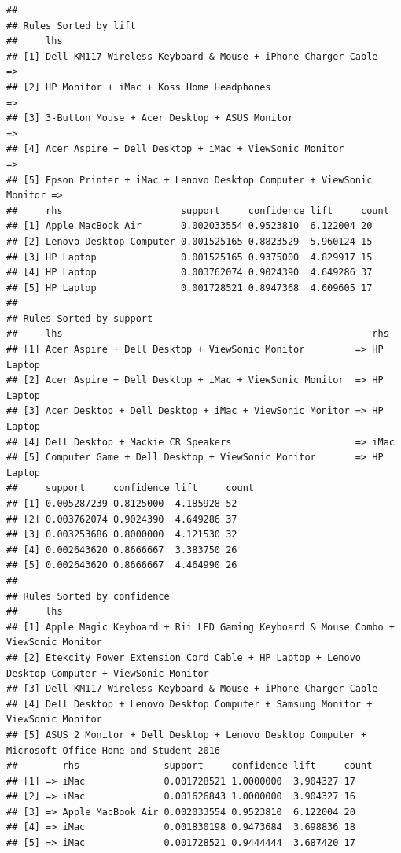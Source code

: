 \documentclass[]{article}
\begin{document}
\begin{verbatim}
## 
## Rules Sorted by lift 
##     lhs                                                                  
## [1] Dell KM117 Wireless Keyboard & Mouse + iPhone Charger Cable        =>
## [2] HP Monitor + iMac + Koss Home Headphones                           =>
## [3] 3-Button Mouse + Acer Desktop + ASUS Monitor                       =>
## [4] Acer Aspire + Dell Desktop + iMac + ViewSonic Monitor              =>
## [5] Epson Printer + iMac + Lenovo Desktop Computer + ViewSonic Monitor =>
##     rhs                     support     confidence lift     count
## [1] Apple MacBook Air       0.002033554 0.9523810  6.122004 20   
## [2] Lenovo Desktop Computer 0.001525165 0.8823529  5.960124 15   
## [3] HP Laptop               0.001525165 0.9375000  4.829917 15   
## [4] HP Laptop               0.003762074 0.9024390  4.649286 37   
## [5] HP Laptop               0.001728521 0.8947368  4.609605 17   
## 
## Rules Sorted by support 
##     lhs                                                       rhs      
## [1] Acer Aspire + Dell Desktop + ViewSonic Monitor         => HP Laptop
## [2] Acer Aspire + Dell Desktop + iMac + ViewSonic Monitor  => HP Laptop
## [3] Acer Desktop + Dell Desktop + iMac + ViewSonic Monitor => HP Laptop
## [4] Dell Desktop + Mackie CR Speakers                      => iMac     
## [5] Computer Game + Dell Desktop + ViewSonic Monitor       => HP Laptop
##     support     confidence lift     count
## [1] 0.005287239 0.8125000  4.185928 52   
## [2] 0.003762074 0.9024390  4.649286 37   
## [3] 0.003253686 0.8000000  4.121530 32   
## [4] 0.002643620 0.8666667  3.383750 26   
## [5] 0.002643620 0.8666667  4.464990 26   
## 
## Rules Sorted by confidence 
##     lhs                                                                                             
## [1] Apple Magic Keyboard + Rii LED Gaming Keyboard & Mouse Combo + ViewSonic Monitor                
## [2] Etekcity Power Extension Cord Cable + HP Laptop + Lenovo Desktop Computer + ViewSonic Monitor   
## [3] Dell KM117 Wireless Keyboard & Mouse + iPhone Charger Cable                                     
## [4] Dell Desktop + Lenovo Desktop Computer + Samsung Monitor + ViewSonic Monitor                    
## [5] ASUS 2 Monitor + Dell Desktop + Lenovo Desktop Computer + Microsoft Office Home and Student 2016
##        rhs               support     confidence lift     count
## [1] => iMac              0.001728521 1.0000000  3.904327 17   
## [2] => iMac              0.001626843 1.0000000  3.904327 16   
## [3] => Apple MacBook Air 0.002033554 0.9523810  6.122004 20   
## [4] => iMac              0.001830198 0.9473684  3.698836 18   
## [5] => iMac              0.001728521 0.9444444  3.687420 17
\end{verbatim}
\end{document}
